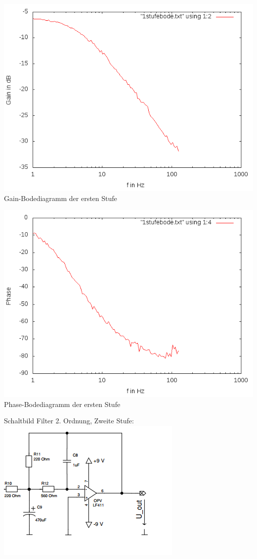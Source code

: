 \documentclass[compress,11pt]{beamer}
\begin{document}
\begin{frame}
\includegraphics[width=.7\textwidth]{4aufgabe/1stufegain}\\
Gain-Bodediagramm der ersten Stufe
\end{frame}
\begin{frame}
\includegraphics[width=.7\textwidth]{4aufgabe/1stufephase}\\
Phase-Bodediagramm der ersten Stufe
\end{frame}



\begin{frame}
Schaltbild Filter 2. Ordnung, Zweite Stufe:\\
\includegraphics[width=.7\textwidth]{schalt/schalt_42}
\end{frame}
\end{document}
